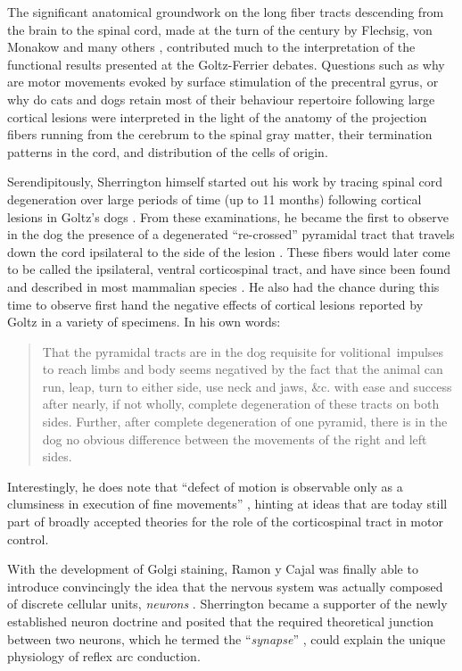 The significant anatomical groundwork on the long fiber tracts descending from the brain to the spinal cord, made at the turn of the century by Flechsig, von Monakow and many others \cite{Nathan1955}, contributed much to the interpretation of the functional results presented at the Goltz-Ferrier debates. Questions such as why are motor movements evoked by surface stimulation of the precentral gyrus, or why do cats and dogs retain most of their behaviour repertoire following large cortical lesions were interpreted in the light of the anatomy of the projection fibers running from the cerebrum to the spinal gray matter, their termination patterns in the cord, and distribution of the cells of origin.

Serendipitously, Sherrington himself started out his work by tracing spinal cord degeneration over large periods of time (up to 11 months) following cortical lesions in Goltz's dogs \cite{Langley1884,Sherrington1885}. From these examinations, he became the first to observe in the dog the presence of a degenerated ``re-crossed'' pyramidal tract that travels down the cord ipsilateral to the side of the lesion \cite{Sherrington1885}. These fibers would later come to be called the ipsilateral, ventral corticospinal tract, and have since been found and described in most mammalian species \cite{Kuypers1981,Brosamle2000,Lacroix2004}. He also had the chance during this time to observe first hand the negative effects of cortical lesions reported by Goltz in a variety of specimens. In his own words:

\blockquote[{\protect\cite[p.189]{Sherrington1885}}]{That the pyramidal tracts are in the dog requisite for volitional~impulses to reach limbs and body seems negatived by the fact that the animal can run, leap, turn to either side, use neck and jaws, \&c. with ease and success after nearly, if not wholly, complete degeneration of these tracts on both sides. Further, after complete degeneration of one pyramid, there is in the dog no obvious difference between the movements of the right and left sides.}

Interestingly, he does note that \enquote{defect of motion is observable only as a clumsiness in execution of fine movements} \cite{Sherrington1885}, hinting at ideas that are today still part of broadly accepted theories for the role of the corticospinal tract in motor control.

With the development of Golgi staining, Ramon y Cajal was finally able to introduce convincingly the idea that the nervous system was actually composed of discrete cellular units, \emph{neurons} \cite{RamonYCajal1894}. Sherrington became a supporter of the newly established neuron doctrine and posited that the required theoretical junction between two neurons, which he termed the ``\emph{synapse}'' \cite{Foster1897}, could explain the unique physiology of reflex arc conduction.

